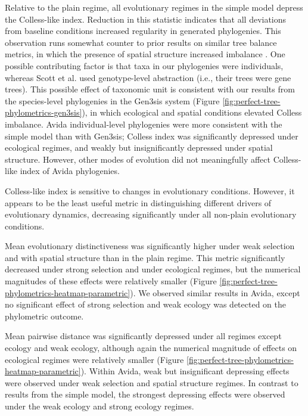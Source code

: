Relative to the plain regime, all evolutionary regimes in the simple model depress the Colless-like index.
Reduction in this statistic indicates that all deviations from baseline conditions increased regularity in generated phylogenies.
This observation runs somewhat counter to prior results on similar tree balance metrics, in which the presence of spatial structure increased imbalance \citep{scottInferringTumorProliferative2020}.
One possible contributing factor is that taxa in our phylogenies were individuals, whereas Scott et al. used genotype-level abstraction (i.e., their trees were gene trees).
This possible effect of taxonomic unit is consistent with our results from the species-level phylogenies in the  Gen3sis system (Figure \ref{fig:perfect-tree-phylometrics-gen3sis}), in which ecological and spatial conditions elevated Colless imbalance.
Avida individual-level phylogenies were more consistent with the simple model than with Gen3sis; Colless index was significantly depressed under ecological regimes, and weakly but insignificantly depressed under spatial structure.
However, other modes of evolution did not meaningfully affect Colless-like index of Avida phylogenies.

Colless-like index is sensitive to changes in evolutionary conditions.
However, it appears to be the least useful metric in distinguishing different drivers of evolutionary dynamics, decreasing significantly under all non-plain evolutionary conditions.

Mean evolutionary distinctiveness was significantly higher under weak selection and with spatial structure than in the plain regime.
This metric significantly decreased under strong selection and under ecological regimes, but the numerical magnitudes of these effects were relatively smaller (Figure \ref{fig:perfect-tree-phylometrics-heatmap-parametric}).
We observed similar results in Avida, except no significant effect of strong selection and weak ecology was detected on the phylometric outcome.

Mean pairwise distance was significantly depressed under all regimes except ecology and weak ecology, although again the numerical magnitude of effects on ecological regimes were relatively smaller (Figure \ref{fig:perfect-tree-phylometrics-heatmap-parametric}).
Within Avida, weak but insignificant depressing effects were observed under weak selection and spatial structure regimes.
In contrast to results from the simple model, the strongest depressing effects were observed under the weak ecology and strong ecology regimes.

